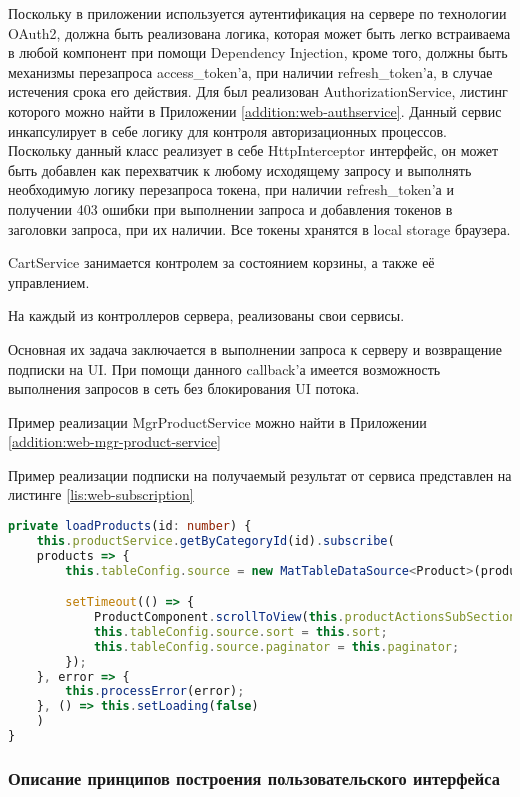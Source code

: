 Поскольку в приложении используется аутентификация на сервере по технологии OAuth2, должна быть реализована логика, которая может быть легко встраиваема в любой компонент при помощи Dependency Injection, кроме того, должны быть механизмы перезапроса access\_token’а, при наличии refresh\_token’а, в случае истечения срока его действия.
Для был реализован AuthorizationService, листинг которого можно найти в Приложении \ref{addition:web-authservice}.
Данный сервис инкапсулирует в себе логику для контроля авторизационных процессов.
Поскольку данный класс реализует в себе HttpInterceptor интерфейс, он может быть добавлен как перехватчик к любому исходящему запросу и выполнять необходимую логику перезапроса токена, при наличии refresh\_token’а и получении 403 ошибки при выполнении запроса и добавления токенов в заголовки запроса, при их наличии.
Все токены хранятся в local storage браузера.

CartService занимается контролем за состоянием корзины, а также её управлением.

На каждый из контроллеров сервера, реализованы свои сервисы.

Основная их задача заключается в выполнении запроса к серверу и возвращение подписки на UI.
При помощи данного callback’а имеется возможность выполнения запросов в сеть без блокирования UI потока.

Пример реализации MgrProductService можно найти в Приложении \ref{addition:web-mgr-product-service}

Пример реализации подписки на получаемый результат от сервиса представлен на листинге \ref{lis:web-subscription}

\begin{lstlisting}[language=TypeScript, captionpos=b,
label={lis:web-subscription},
caption={Пример реализации подписки на ожидаемый результат от сервера}
]
private loadProducts(id: number) {
    this.productService.getByCategoryId(id).subscribe(
    products => {
        this.tableConfig.source = new MatTableDataSource<Product>(products);

        setTimeout(() => {
            ProductComponent.scrollToView(this.productActionsSubSection);
            this.tableConfig.source.sort = this.sort;
            this.tableConfig.source.paginator = this.paginator;
        });
    }, error => {
        this.processError(error);
    }, () => this.setLoading(false)
    )
}
\end{lstlisting}

\subsubsection{Описание принципов построения пользовательского интерфейса}\indent

